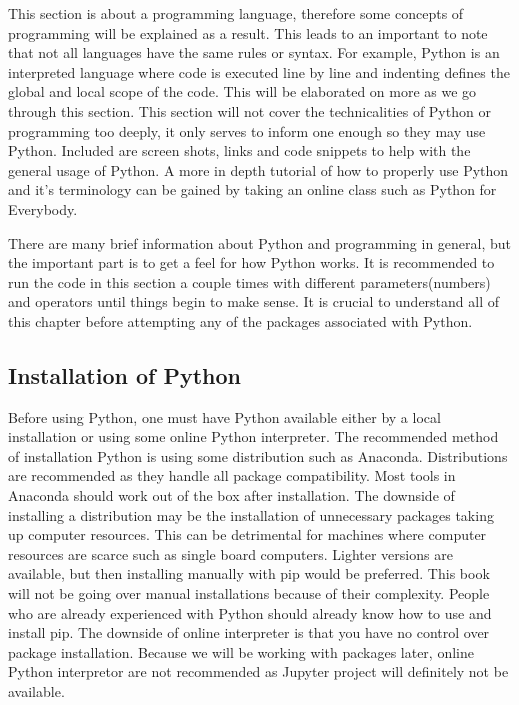 \documentclass[11pt,a4paper]{book}
\begin{document}
		This section is about a programming language, therefore some concepts of programming will be explained as a result. This leads to an important to note that not all languages have the same rules or syntax. For example, Python is an interpreted language where code is executed line by line and indenting defines the global and local scope of the code. This will be elaborated on more as we go through this section. This section will not cover the technicalities of Python or programming too deeply, it only serves to inform one enough so they may use Python. Included are screen shots, links and code snippets to help with the general usage of Python. A more in depth tutorial of how to properly use Python and it's terminology can be gained by taking an online class such as Python for Everybody.
		
		There are many brief information about Python and programming in general, but the important part is to get a feel for how Python works. It is recommended to run the code in this section a couple times with different parameters(numbers) and operators until things begin to make sense. It is crucial to understand all of this chapter before attempting any of the packages associated with Python.
		
		\subsection{Installation of Python}
			\label{subsec:Installation of Python}
			Before using Python, one must have Python available either by a local installation or using some online Python interpreter. The recommended method of installation Python is using some distribution such as Anaconda. Distributions are recommended as they handle all package compatibility. Most tools in Anaconda should work out of the box after installation. The downside of installing a distribution may be the installation of unnecessary packages taking up computer resources. This can be detrimental for machines where computer resources are scarce such as single board computers. Lighter versions are available, but then installing manually with pip would be preferred. This book will not be going over manual installations because of their complexity. People who are already experienced with Python should already know how to use and install pip. The downside of online interpreter is that you have no control over package installation. Because we will be working with packages later, online Python interpretor are not recommended as Jupyter project will definitely not be available. 
			
\end{document}
